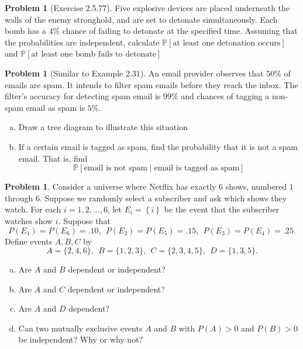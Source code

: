 \documentclass[10pt]{article}
\theoremstyle{definition}
\newtheorem{problem}[theorem]{Problem}
\newcommand{\1}[1]{\textbf{1}_{\left[#1\right]}} %
\def\P{\mathbb{P}} %
\begin{document}
\begin{problem}[Exercise 2.5.77]
  Five explosive devices are placed underneath the walls of the enemy
  stronghold, and are set to detonate simultaneously. Each bomb has a 4\%
  chance of failing to detonate at the specified time. Assuming that the
  probabilities are independent, calculate
  $\P\left[\text{at least one detonation occurs} \right]$ and
  $\P\left[\text{at least one bomb fails to detonate} \right]$
\end{problem}

\begin{problem}[Similar to Example 2.31]
  An email provider observes that $50\%$ of emails are spam. It intends to filter spam emails before they
  reach the inbox. The filter's accuracy for detecting spam email is $99\%$ and chances of tagging a
  non-spam email as spam is $5\%$.
  \begin{enumerate}[(a)]
    \item Draw a tree diagram to illustrate this situation
    \item If a certain email is tagged as spam, find the probability that it is not a spam email. That
    is, find
    \begin{equation*}
      \P\left[\text{email is not spam}\mid \text{email is tagged as spam} \right]
    \end{equation*}
  \end{enumerate}
\end{problem}



\begin{problem}
  Consider a universe where Netflix has exactly 6 shows, numbered $1$ through
  $6$. Suppose we randomly select a subscriber and ask which shows they watch.
  For each $i=1,2,\ldots,6$, let $E_{i}= \left\{i\right\} $ be the event that
  the subscriber watches show $i$. Suppose that
  \begin{equation*}
    P(E_1) = P(E_6) =  .10,  \ \ P(E_2) = P(E_5) = .15, \ \  P(E_3) = P(E_4) = .25.
  \end{equation*}
  Define events $A, B, C$ by
  \begin{equation*}
    A = \{2, 4, 6\},\ \  B = \{1, 2, 3\}, \ \ C = \{2, 3, 4, 5\}, \ \ D = \{1, 3, 5\}.
  \end{equation*}
  \begin{enumerate}[(a)]
    \item Are $A$ and $B$ dependent or independent?
    \item Are $A$ and $C$ dependent or independent?
    \item Are $A$ and $D$ dependent?
    \item Can two mutually exclusive events $A$ and $B$ with $P(A)>0$ and $P(B)>0$ be independent? Why or
    why not?
  \end{enumerate}
\end{problem}
\end{document}
